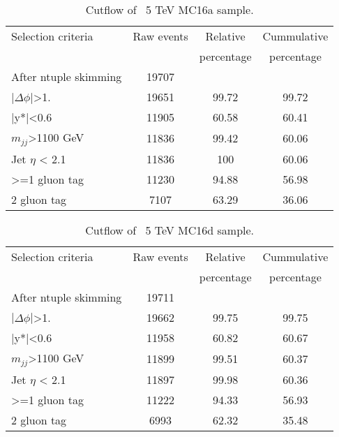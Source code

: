 \begin{table}[ht]
\begin{center}
\begin{tabular}{|l|c|c|c|}
\hline
Selection criteria & Raw events &  Relative & Cummulative \\
 & & percentage & percentage \\
\hline
After ntuple skimming & 19707 &  &  \\
$|\Delta\phi|$>1. & 19651 & 99.72 & 99.72 \\
|y*|<0.6 & 11905 & 60.58 & 60.41 \\
$m_{jj}$>1100 GeV & 11836 & 99.42 & 60.06 \\
Jet $\eta$ < 2.1 & 11836 & 100 & 60.06 \\
>=1 gluon tag & 11230 & 94.88 & 56.98 \\
2 gluon tag & 7107 & 63.29 & 36.06 \\
\hline
\end{tabular}
\end{center}
\caption{Cutflow of \Hprime\ 5 TeV MC16a sample.}
\end{table}

\begin{table}[ht]
\begin{center}
\begin{tabular}{|l|c|c|c|}
\hline
Selection criteria & Raw events &  Relative & Cummulative \\
 & & percentage & percentage \\
\hline
After ntuple skimming & 19711 &  &  \\
$|\Delta\phi|$>1. & 19662 & 99.75 & 99.75 \\
|y*|<0.6 & 11958 & 60.82 & 60.67 \\
$m_{jj}$>1100 GeV & 11899 & 99.51 & 60.37 \\
Jet $\eta$ < 2.1 & 11897 & 99.98 & 60.36 \\
>=1 gluon tag & 11222 & 94.33 & 56.93 \\
2 gluon tag & 6993 & 62.32 & 35.48 \\
\hline
\end{tabular}
\end{center}
\caption{Cutflow of \Hprime\ 5 TeV MC16d sample.}
\end{table}

